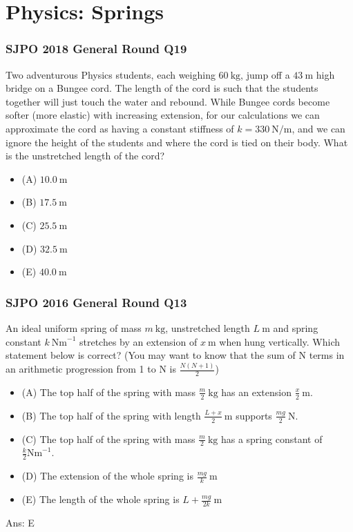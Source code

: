 \documentclass{article}
\begin{document}
\clearpage

\section{Physics: Springs}
\subsubsection{SJPO 2018 General Round Q19}
Two adventurous Physics students, each weighing $60 \mathrm{~kg}$, jump off a $43 \mathrm{~m}$ high bridge on a Bungee cord. The length of the cord is such that the students together will just touch the water and rebound. While Bungee cords become softer (more elastic) with increasing extension, for our calculations we can approximate the cord as having a constant stiffness of $k=330 \mathrm{~N} / \mathrm{m}$, and we can ignore the height of the students and where the cord is tied on their body. What is the unstretched length of the cord?
\begin{itemize}
\item[] (A) $10.0 \mathrm{~m}$
\item[] (B) $17.5 \mathrm{~m}$
\item[] (C) $25.5 \mathrm{~m}$
\item[] (D) $32.5 \mathrm{~m}$
\item[] (E) $40.0 \mathrm{~m}$
\end{itemize}
\subsubsection{SJPO 2016 General Round Q13}
An ideal uniform spring of mass $m \mathrm{~kg}$, unstretched length $L \mathrm{~m}$ and spring constant $k\  \mathrm{Nm}^{-1}$ stretches by an extension of $x \mathrm{~m}$ when hung vertically. Which statement below is correct? (You may want to know that the sum of $\mathrm{N}$ terms in an arithmetic progression from 1 to $\mathrm{N}$ is $\frac{N(N+1)}{2}$)
\begin{itemize}
\item[] (A) The top half of the spring with mass $\frac{m}{2} \mathrm{~kg}$ has an extension $\frac{x}{2} \mathrm{~m}$.
\item[] (B) The top half of the spring with length $\frac{L+x}{2} \mathrm{~m}$ supports $\frac{m g}{2} \mathrm{~N}$.
\item[] (C) The top half of the spring with mass $\frac{m}{2} \mathrm{~kg}$ has a spring constant of $\frac{k}{2} \mathrm{Nm}^{-1}$.
\item[] (D) The extension of the whole spring is $\frac{m g}{k} \mathrm{~m}$
\item[] (E) The length of the whole spring is $L+\frac{m g}{2 k} \mathrm{~m}$
\end{itemize}
Ans: \ifpaper E \fi
\end{document}
